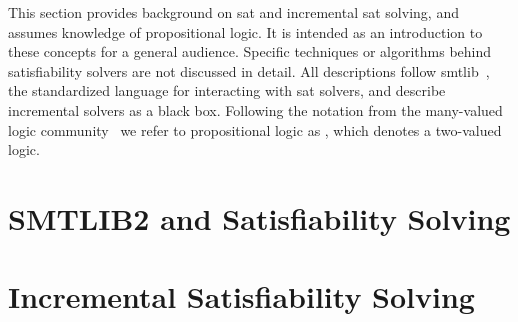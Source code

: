 \label{chapter:background}
%
This section provides background on \ac{sat} and incremental \ac{sat} solving,
and assumes knowledge of propositional logic. It is intended as an introduction
to these concepts for a general audience. Specific techniques or algorithms
behind satisfiability solvers are not discussed in detail. All descriptions
follow \acl{smtlib}~\cite{BarFT-SMTLIB}, the standardized language for
interacting with \ac{sat} solvers, and describe incremental solvers as a black
box. Following the notation from the many-valued logic
community~\cite{Rescher1969-RESML} we refer to propositional logic as \pl{},
which denotes a two-valued logic.
%
\section{SMTLIB2 and Satisfiability Solving}

%
\section{Incremental Satisfiability Solving}


